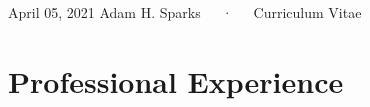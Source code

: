 \documentclass[11pt, a4paper]{awesome-cv}
\begin{document}
\makecvheader

\makecvfooter
  {April 05, 2021}
    {Adam H. Sparks~~~·~~~Curriculum Vitae}
  {\thepage}





\hypertarget{professional-experience}{%
\section{Professional Experience}\label{professional-experience}}
\end{document}
